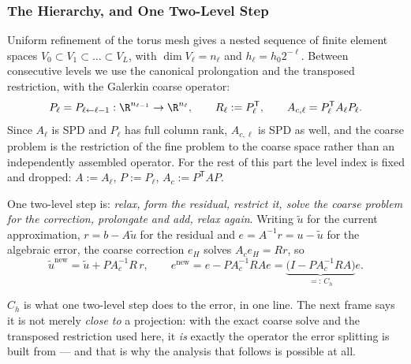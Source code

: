 \frametitle{The Hierarchy, and One Two-Level Step}
\footnotesize

Uniform refinement of the torus mesh gives a nested sequence of finite element spaces
$V_0\subset V_1\subset\dots\subset V_L$, with $\dim V_\ell=n_\ell$ and
$h_\ell=h_0 2^{-\ell}$. Between consecutive levels we use the canonical prolongation and
the transposed restriction, with the Galerkin coarse operator:
\[
P_\ell=P_{\ell\leftarrow\ell-1}:\R^{n_{\ell-1}}\to\R^{n_\ell},
\qquad
R_\ell:=P_\ell^{\mathsf T},
\qquad
A_{c,\ell}=P_\ell^{\mathsf T}A_\ell P_\ell .
\]
Since $A_\ell$ is SPD and $P_\ell$ has full column rank, $A_{c,\ell}$ is SPD as well, and
the coarse problem is the restriction of the fine problem to the coarse space rather than
an independently assembled operator. For the rest of this part the level index is fixed
and dropped: $A:=A_\ell$, $P:=P_\ell$, $A_c:=P^{\mathsf T}AP$.

\vspace{1mm}
One two-level step is: \emph{relax, form the residual, restrict it, solve the coarse
problem for the correction, prolongate and add, relax again}. Writing $\widetilde u$ for
the current approximation, $r=b-A\widetilde u$ for the residual and
$e=A^{-1}r=u-\widetilde u$ for the algebraic error, the coarse correction $e_H$ solves
$A_c e_H=Rr$, so
\[
\widetilde u^{\text{new}}=\widetilde u+PA_c^{-1}R\,r ,
\qquad
e^{\text{new}}=e-PA_c^{-1}RAe
=\underbrace{\bigl(I-PA_c^{-1}RA\bigr)}_{=:\,C_h}e .
\]

\begin{block}{}
$C_h$ is what one two-level step does to the error, in one line. The next frame says it is
not merely \emph{close to} a projection: with the exact coarse solve and the transposed
restriction used here, it \emph{is} exactly the operator the error splitting is built
from --- and that is why the analysis that follows is possible at all.
\end{block}
